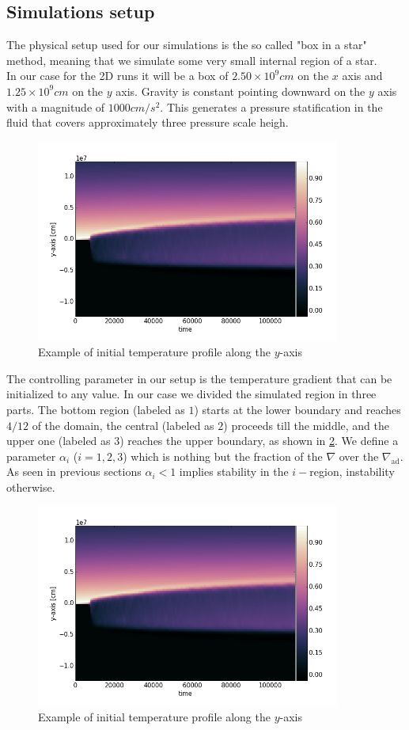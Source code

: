 \subsection{Simulations setup}
The physical setup used for our simulations is the so called "box in a star" method, meaning that we simulate some very small internal region of a star. \\
In our case for the 2D runs it will be a box of $2.50 \times 10^{9} cm$ on the $x$ axis and $1.25 \times 10^{9} cm$ on the $y$ axis. Gravity is constant pointing downward on the $y$ axis with a magnitude of $1000 cm/s^2$. This generates a pressure statification in the fluid that covers approximately three pressure scale heigh. \\
\begin{figure}[t]
\includegraphics[width=10cm]{./img/tempprofile}
\caption{Example of initial temperature profile along the $y$-axis}
\label{fig:tempprofile}
\centering
\end{figure}
The controlling parameter in our setup is the temperature gradient that can be initialized to any value. In our case we divided the simulated region in three parts. The bottom region (labeled as $1$) starts at the lower boundary and reaches $4/12$ of the domain, the central (labeled as $2$) proceeds till the middle, and the upper one (labeled as $3$) reaches the upper boundary, as shown in \ref{fig:tempprofile}. We define a parameter $\alpha_{i}$ ($i=1, 2, 3$) which is nothing but the fraction of the $\nabla$ over the $\nabla_{\mathrm{ad}}$. As seen in previous sections $\alpha_{i}<1$ implies stability in the $i-$region, instability otherwise. \\
\begin{figure}[t]
\includegraphics[width=10cm]{./img/tempprofile}
\caption{Example of initial temperature profile along the $y$-axis}
\label{fig:tempprofile}
\centering
\end{figure}

